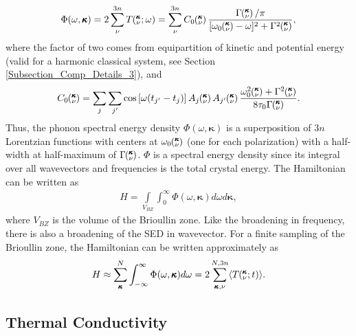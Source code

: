 \documentclass[letterpaper,12pt]{article}
\newcommand{\kvt}{\mspace{-4.0mu}\left(\mspace{-8.0mu}\begin{smallmatrix}&\pmb{\kappa} \\&\nu\end{smallmatrix}\mspace{-2.0mu};t\right)}
\newcommand{\kvw}{\mspace{-4.0mu}\left(\mspace{-8.0mu}\begin{smallmatrix}&\pmb{\kappa} \\&\nu\end{smallmatrix}\mspace{-2.0mu};\omega\right)}
\newcommand{\kv}{\mspace{-4.0mu}\left(\mspace{-8.0mu}\begin{smallmatrix}&\pmb{\kappa} \\&\nu\end{smallmatrix}\mspace{-3.0mu}\right)}
\begin{document}
\begin{equation}\label{A:E:Lorentzian_NMD}
\begin{split}
\Phi(\omega,\pmb{\kappa}) = 2\sum_{\nu}^{3n} T\kvw=\sum_{\nu}^{3n}C_0\kv\frac{\Gamma\kv/\pi}{[\omega_0\kv-\omega]^2+\Gamma^2\kv},
\end{split}
\end{equation}
where the factor of two comes from equipartition of kinetic and potential energy (valid for a harmonic classical system, see Section \ref{Subsection_Comp_Details_3}), and
\begin{equation}\label{A:E:C_0}
\begin{split}
C_0\kv = \sum_j\sum_{j'}\cos\left[\omega (t_{j'}-t_j)\right]A_j\kv A_{j'}\kv\frac{\omega_0^2\kv+\Gamma^2\kv}{8\tau_0\Gamma\kv}.
\end{split}
\end{equation}
Thus, the phonon spectral energy density $\Phi(\omega,\pmb{\kappa})$ is a superposition of $3n$ Lorentzian
functions with centers at $\omega_0\kv$ (one for each polarization) with a half-width at half-maximum of
$\Gamma\kv$. $\Phi$ is a spectral energy density since its integral over all wavevectors and frequencies is the total crystal energy. The Hamiltonian can be written as
\begin{equation}\label{A:E:equipartition}
\begin{split}
H=\int\limits_{V_{BZ}} \int_{0}^{\infty}\Phi(\omega,\pmb{\kappa})d\omega d\pmb{\kappa},
\end{split}
\end{equation}
where $V_{BZ}$ is the volume of the Brioullin zone.  Like the broadening in frequency, there is also a broadening of the SED in wavevector.\cite{turneythesis} For a finite sampling of the Brioullin zone, the Hamiltonian can be written approximately as
\begin{equation}\label{A:E:equipartition}
\begin{split}
H \approx \sum_{\pmb{\kappa}}^N \int_{-\infty}^{\infty}\Phi(\omega,\pmb{\kappa})d\omega = 2\sum_{\pmb{\kappa},\nu}^{N,3n}\langle T\kvt\rangle.
\end{split}
\end{equation}

\subsection{\label{Subsection_Comp_Details_3}Thermal Conductivity}
\end{document}
